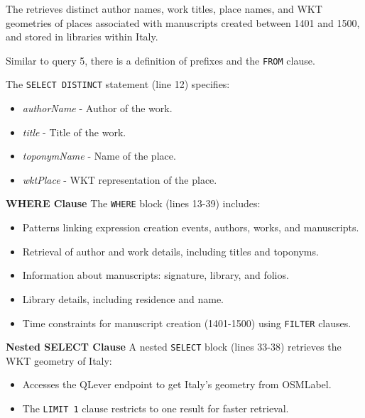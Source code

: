 
The  retrieves distinct author names, work titles, place names, and WKT geometries of places associated with manuscripts created between 1401 and 1500, and stored in libraries within Italy.

Similar to query 5, there is a definition of prefixes and the \texttt{FROM} clause.

The \texttt{SELECT DISTINCT} statement (line 12) specifies:
\begin{itemize}
    \item \textit{authorName} - Author of the work.
    \item \textit{title} - Title of the work.
    \item \textit{toponymName} - Name of the place.
    \item \textit{wktPlace} - WKT representation of the place.
\end{itemize}

\textbf{WHERE Clause}
The \texttt{WHERE} block (lines 13-39) includes:
\begin{itemize}
    \item Patterns linking expression creation events, authors, works, and manuscripts.
    \item Retrieval of author and work details, including titles and toponyms.
    \item Information about manuscripts: signature, library, and folios.
    \item Library details, including residence and name.
    \item Time constraints for manuscript creation (1401-1500) using \texttt{FILTER} clauses.
\end{itemize}

\textbf{Nested SELECT Clause}
A nested \texttt{SELECT} block (lines 33-38) retrieves the WKT geometry of Italy:
\begin{itemize}
    \item Accesses the QLever endpoint to get Italy’s geometry from \acrshort{OSMLabel}.
    \item The \texttt{LIMIT 1} clause restricts to one result for faster retrieval.
\end{itemize}

